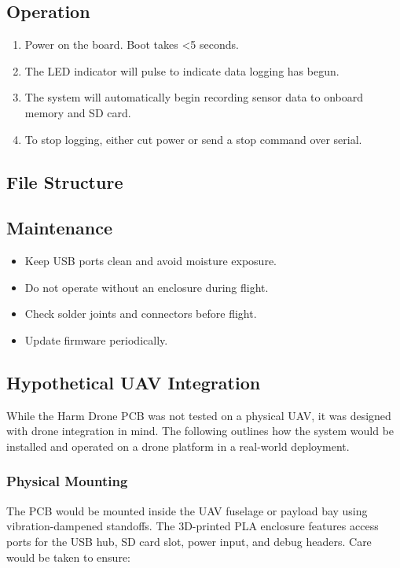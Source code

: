 \documentclass[../main.tex]{subfiles}
\begin{document}
\subsection{Operation}
\begin{enumerate}
    \item Power on the board. Boot takes <5 seconds.
    \item The LED indicator will pulse to indicate data logging has begun.
    \item The system will automatically begin recording sensor data to onboard memory and SD card.
    \item To stop logging, either cut power or send a stop command over serial.
\end{enumerate}

\subsection{File Structure}
\begin{itemize}
\end{itemize}

\subsection{Maintenance}
\begin{itemize}
    \item Keep USB ports clean and avoid moisture exposure.
    \item Do not operate without an enclosure during flight.
    \item Check solder joints and connectors before flight.
    \item Update firmware periodically.
\end{itemize}
\subsection{Hypothetical UAV Integration}

While the Harm Drone PCB was not tested on a physical UAV, it was designed with drone integration in mind. The following outlines how the system would be installed and operated on a drone platform in a real-world deployment.

\subsubsection{Physical Mounting}
The PCB would be mounted inside the UAV fuselage or payload bay using vibration-dampened standoffs. The 3D-printed PLA enclosure features access ports for the USB hub, SD card slot, power input, and debug headers. Care would be taken to ensure:
\end{document}
